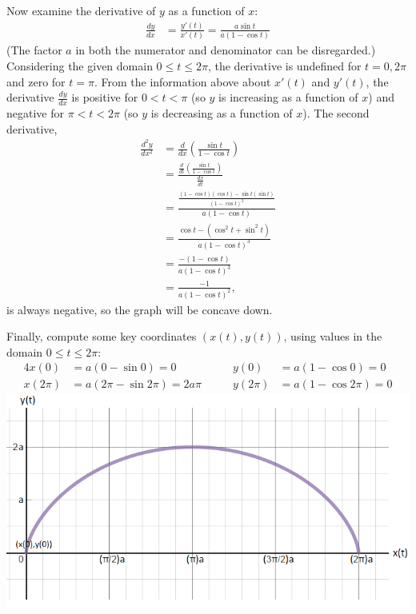 \documentclass[12pt]{article}
\begin{document}
\begin{enumerate}[1.]
\begin{enumerate}[(a)]
\vspace{1pc}
Now examine the derivative of $y$ as a function of $x$:
\[\begin{split}
\frac{dy}{dx} &= \frac{y'(t)}{x'(t)} = \frac{a\sin{t}}{a(1-\cos{t})}
\end{split}\]
(The factor $a$ in both the numerator and denominator can be disregarded.)  Considering the given domain $0\leq t\leq 2\pi$, the derivative is undefined for $t=0,2\pi$ and zero for $t=\pi$.  From the information above about $x'(t)$ and $y'(t)$, the derivative $\textstyle\frac{dy}{dx}$ is positive for $0 < t <\pi$ (so $y$ is increasing as a function of $x$) and negative for $\pi < t < 2\pi$ (so $y$ is decreasing as a function of $x$).  The second derivative,
\[\begin{split}
\frac{d^2y}{dx^2} &= \frac{d}{dx}\left(\frac{\sin{t}}{1-\cos{t}}\right) \\
	&= \frac{\frac{d}{dt}\left(\frac{\sin{t}}{1-\cos{t}}\right)}{\frac{dx}{dt}} \\
	&= \frac{\frac{(1-\cos{t})(\cos{t})-\sin{t}(\sin{t})}{\left(1-\cos{t}\right)^2}}{a(1-\cos{t})} \\
	&= \frac{\cos{t}-(\cos^2{t}+\sin^2{t})}{a(1-\cos{t})^3} \\
	&= \frac{-(1-\cos{t})}{a(1-\cos{t})^3} \\
	&= \frac{-1}{a(1-\cos{t})^2}, 
\end{split}\]
is always negative, so the graph will be concave down.

\vspace{1pc}
Finally, compute some key coordinates $(x(t),y(t))$, using values in the domain $0\leq t\leq 2\pi$: 
\begin{alignat*}{4}
x(0) &= a(0-\sin{0})=0 &\qquad y(0) &= a(1-\cos{0})=0 \\
x(2\pi) &= a(2\pi-\sin{2\pi})=2a\pi &\qquad y(2\pi) &=a(1-\cos{2\pi})=0
\end{alignat*}
\includegraphics[scale=0.83]{Q3pic}
\end{enumerate}


\end{enumerate}
\end{document}
